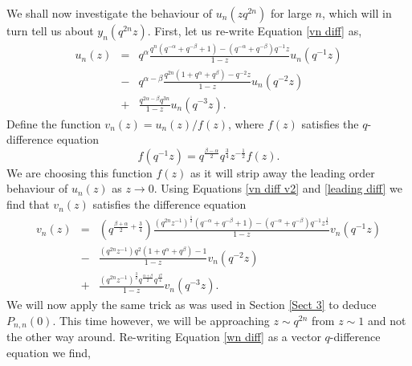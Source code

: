 \documentclass[a4paper,reqno]{amsart}
\numberwithin{equation}{section}
\numberwithin{figure}{section}
\begin{document}
We shall now investigate the behaviour of $u_n(zq^{2n})$ for large $n$, which will in turn tell us about $y_n(q^{2n}z)$. First, let us re-write Equation \eqref{vn diff} as,
\begin{eqnarray}\label{vn diff v2}
u_n(z) &=& q^{\alpha}\frac{q^{n}(q^{-\alpha} + q^{-\beta} + 1) - (q^{-\alpha}+q^{-\beta})q^{-1}z}{1-z}u_n(q^{-1}z) \nonumber \\
&-& q^{\alpha-\beta}\frac{ q^{2n}(1+q^{\alpha} + q^{\beta})-q^{-2}z}{1-z}u_n(q^{-2}z) \nonumber \\
&+& \frac{q^{2\alpha-\beta}q^{3n}}{1-z}u_n(q^{-3}z). 
\end{eqnarray}
Define the function $v_n(z) = u_n(z)/f(z)$, where $f(z)$ satisfies the $q$-difference equation 
\begin{equation}\label{leading diff}
    f(q^{-1}z) = q^{\frac{\beta-\alpha}{2}}q^{\frac{3}{4}}z^{-\frac{1}{2}}f(z).
\end{equation}
We are choosing this function $f(z)$ as it will strip away the leading order behaviour of $u_n(z)$ as $z\to0$. Using Equations \eqref{vn diff v2} and \eqref{leading diff} we find that $v_n(z)$ satisfies the difference equation
\begin{eqnarray}\label{wn diff}
v_n(z) &=& \left(q^{\frac{\beta+\alpha}{2}+\frac{3}{4}}\right)\frac{(q^{2n}z^{-1})^{\frac{1}{2}}(q^{-\alpha} + q^{-\beta} + 1) - (q^{-\alpha}+q^{-\beta})q^{-1}z^{\frac{1}{2}}}{1-z}v_n(q^{-1}z) \nonumber \\
&-& \frac{ \left(q^{2n}z^{-1}\right)q^2(1+q^{\alpha} + q^{\beta})-1}{1-z}v_n(q^{-2}z) \nonumber \\
&+& \frac{\left(q^{2n}z^{-1}\right)^{\frac{3}{2}}q^{\frac{\alpha+\beta}{2}}q^{\frac{17}{4}} }{1-z}v_n(q^{-3}z). \nonumber 
\end{eqnarray}
We will now apply the same trick as was used in Section \ref{Sect 3} to deduce $P_{n,n}(0)$. This time however, we will be approaching $z\sim q^{2n}$ from $z\sim 1$ and not the other way around. Re-writing Equation \eqref{wn diff} as a vector $q$-difference equation we find,
\end{document}
